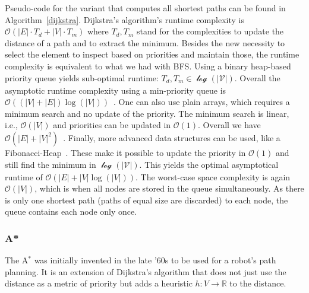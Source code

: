             Pseudo-code for the variant that computes all shortest paths can be found in Algorithm~\ref{dijkstra}. 
            Dijkstra's algorithm's runtime complexity is $\mathcal{O}(|E| \cdot T_d + |V| \cdot T_m)$ where $T_d, T_m$ stand for the complexities to update the distance of a path and to extract the minimum.
            Besides the new necessity to select the element to inspect based on priorities and maintain those, the runtime complexity is equivalent to what we had with BFS.        
            Using a binary heap-based priority queue yields sub-optimal runtime:
            $T_d, T_m \in \mathcal{\log(|V|)}$. 
            Overall the asymptotic runtime complexity using a min-priority queue is $\mathcal{O}((|V| + |E|)\log(|V|))$~\autocite{Goodrich2014AlgorithmDA}.        
            One can also use plain arrays, which requires a minimum search and no update of the priority. 
            The minimum search is linear, i.e., $\mathcal{O}(|V|)$ and priorities can be updated in $\mathcal{O}(1)$. 
            Overall we have $\mathcal{O}(|E| + |V|^2)$~\autocite{Goodrich2014AlgorithmDA}.        
            Finally, more advanced data structures can be used, like a Fibonacci-Heap~\autocite{cormen2009introduction}. 
            These make it possible to update the priority in $\mathcal{O}(1)$ and still find the minimum in $\mathcal{\log(|V|)}$. 
            This yields the optimal asymptotical runtime of $\mathcal{O}(|E| + |V|\log(|V|))$. 
           The worst-case space complexity is again $\mathcal{O}(|V|)$, which is when all nodes are stored in the queue simultaneously. 
            As there is only one shortest path (paths of equal size are discarded) to each node, the queue contains each node only once.
        
        \subsubsection*{A*}
            The A$^*$ was initially invented in the late '60s to be used for a robot's path planning. 
            It is an extension of Dijkstra's algorithm that does not just use the distance as a metric of priority but adds a heuristic $h: V \rightarrow \mathbb{R}$ to the distance.
            
